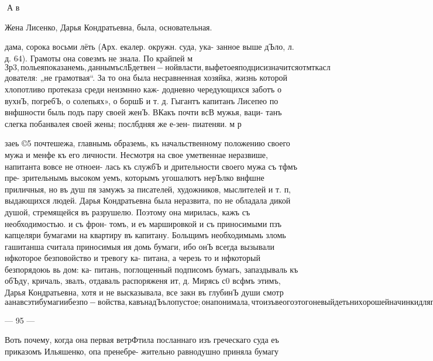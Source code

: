 А в

Жена Лисенко, Дарья Кондратьевна, была, основательная.

дама, сорока восьми лёть (Арх. екалер. окружн. суда, ука-
занное выше дЪло, л. д. 64). Грамоты она совезмъ не знала.
По крайпей м$Зр3, поль ея показанемь, даннымъ слБдетвен-
ной власти, выфето ея подциси значится отм тка сл$дователя:
„не грамотвая“. За то она была несравненная хозяйка,
жизнь которой хлопотливо протеказа среди неизмнно каж-
додневно чередующихся заботъ о вухнЪ, погребЪ, о солепьях»,
о боршБ и т. д. Гыгантъ капитанъ Лисепео по внфшности
быль подъ пару своей женЪ. ВКакъ почти всВ мужья, ваци-
танъ слегка побанвалея своей жены; послбдняя же е-зен-
пиатеняи. м р

заеь ©5 почтешежа, главнымь образемь, къ начальственному
положению своего мужа и менфе къ его личности. Несмотря
на свое уметвеннае неразвише, напитанта вовсе не отноеи-
лась къ службЪ и дрительности своего мужа съ тфмъ пре-
зрительнымь высоком уемъ, которымъ угошалютъ нерЪлко
внфшне приличныя, но въ душ%
пя замужъ за писателей, художников, мыслителей и т. п,
выдающихся людей. Дарья Кондратьевна была неразвита,
по не обладала дикой душой, стремящейся въ разрушелю.
Поэтому она мирилась, кажъ съ необходимостью. и съ фрон-
томъ, и еъ маршировкой и съ приносимыми пзъ капцеляри
бумагами на квартиру въ капитану. Больщимъ необходимымь
зломь гашитанша считала приносимыя ия домь бумаги, ибо
онЪ всегда вызывали нфкоторое безповойство и тревогу ка-
питана, а черезь то и нфкоторый безпорядоюь вь дом: ка-
питань, поглощенный подписомъ бумагь, запаздываль къ
обЪду, кричаль, звалъ, отдаваль распоряженя ит, д. Мирясь
с0 всфмъ этимъ, Дарья Кондратьевна, хотя и не высказывала,
все закн въ глубинЪ души смотр$аа на вс эти бумаги и безпо-
войства, кавъ на дЪъло пустое; она понимала, что изъ веого этого не
выйдеть ни хорошей начинки для пироговъ, ни солен!й, ни борща.

4

$

— 95 —

Воть почему, когда она первая ветрФтила посланнаго
изъ греческаго суда еъ приказомъ Ильяшенко, опа пренебре-
жительно равнодушно приняла бумагу

